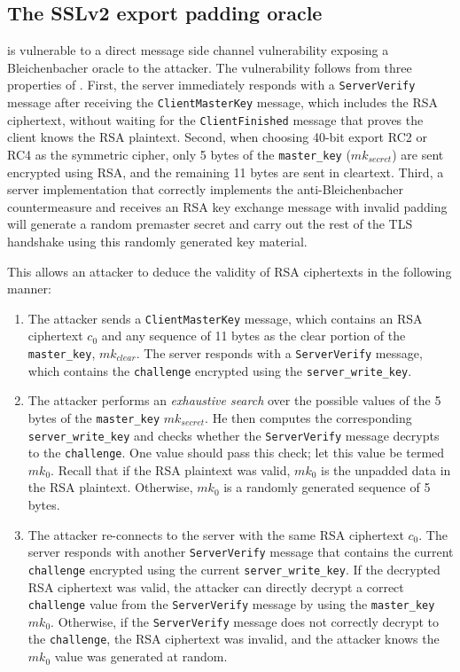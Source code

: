 \subsection{The SSLv2 export padding oracle} 
\label{vulnerability}
\ssltwo is vulnerable to a direct message side channel vulnerability exposing a Bleichenbacher oracle to the attacker.
The vulnerability follows from three properties of \ssltwo.  First, the server immediately responds with a \texttt{ServerVerify} message after receiving the \texttt{ClientMasterKey} message, which includes the RSA ciphertext, without waiting for the \texttt{ClientFinished} message that proves the client knows the RSA plaintext.  Second, when choosing 40-bit export RC2 or RC4 as the symmetric cipher, only 5 bytes of the \texttt{master\_key} ($mk_{secret}$) are sent encrypted using RSA, and the remaining 11 bytes are sent in cleartext.  Third, a server
implementation that correctly implements the anti-Bleichenbacher countermeasure 
and receives an RSA key exchange message with invalid
padding will generate a random premaster secret and carry out the
rest of the TLS handshake using this randomly generated key material.

This allows an attacker to deduce the validity of RSA ciphertexts in the following manner:

\begin{enumerate}
	\item The attacker sends a \texttt{ClientMasterKey} message, which contains an RSA ciphertext $c_0$ and any sequence of 11 bytes as the clear portion of the \texttt{master\_key}, $mk_{clear}$. The server responds with a \texttt{ServerVerify} message, which contains the \texttt{challenge} encrypted using the \texttt{server\_write\_key}.
	\item The attacker performs an \textit{exhaustive search} over the possible values of the 5 bytes of the \texttt{master\_key} $mk_{secret}$. He then computes the corresponding \texttt{server\_write\_key} and checks whether the \texttt{ServerVerify} message decrypts to the \texttt{challenge}. One value should pass this check; let this value be termed $mk_0$. Recall that if the RSA plaintext was valid, $mk_0$ is the unpadded data in the RSA plaintext. Otherwise, $mk_0$ is a randomly generated sequence of 5 bytes.
	\item The attacker re-connects to the server with the same RSA ciphertext $c_0$. The server responds with another \texttt{ServerVerify} message that contains the current \texttt{challenge} encrypted using the current \texttt{server\_write\_key}. If the decrypted RSA ciphertext was valid, the attacker can directly decrypt a correct \texttt{challenge} value from the \texttt{ServerVerify} message by using the \texttt{master\_key} $mk_0$. Otherwise, if the \texttt{ServerVerify} message does not correctly decrypt to the \texttt{challenge}, the RSA ciphertext was invalid, and the attacker knows the $mk_0$ value was generated at random.
\end{enumerate}

